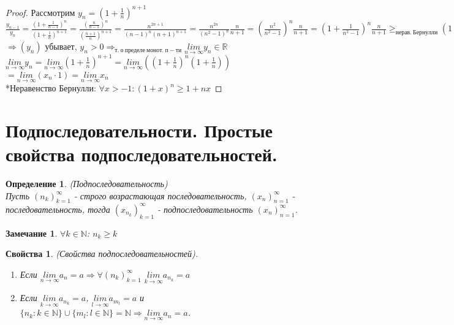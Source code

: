 \documentclass[12pt, a4]{article}
\newtheorem*{definition}{Определение}
\newtheorem*{remark}{Замечание}
\newtheorem*{properties}{Свойства}
\renewcommand{\lim}[2]{\underset{#1 \rightarrow #2}{lim}}
\newcommand{\limn}{\lim{n}{\infty}}
\renewcommand{\implies}{\Rightarrow}
\newcommand{\R}{\mathbb{R}}
\newcommand{\N}{\mathbb{N}}
\begin{document}
\begin{proof}

Рассмотрим $y_n = (1 + \frac{1}{n})^{n+1}$\\
$\frac{y_{n-1}}{y_n} = \frac{(1 + \frac{1}{n-1})^n}{(1 + \frac{1}{n})^{n+1}}=\frac{(\frac{n}{n-1})^n}{(\frac{n+1}{n})^{n+1}}=\frac{n^{2n+1}}{(n-1)^n (n+1)^{n+1}} = \frac{n^{2n}}{(n^2-1)^n} \frac{n}{n+1} = (\frac{n^2}{n^2-1})^n \frac{n}{n+1} = (1 + \frac{1}{n^2-1})^n \frac{n}{n+1} \geq_{нерав.\ Бернулли} (1+\frac{n}{n^2-1}) \frac{n}{n+1} = \frac{n^2+n-1}{n^2-1} \frac{n}{n+1} = \frac{n^3+n^2-n}{n^3+n^2-n-1} \geq 1$\\$ \implies (y_n)$ убывает, $y_n > 0 \implies_{т.\ о\ пределе\ монот.\ п-ти} \limn y_n \in \R$\\

$\limn y_n = \limn (1 + \frac{1}{n})^{n+1} = \limn ((1 + \frac{1}{n})^n (1 + \frac{1}{n}))$\\$ = \limn (x_n \cdot 1) = \limn x_n$\\

*Неравенство Бернулли: $\forall x > -1: (1+x)^n \geq 1 + nx$

\end{proof}

\section{Подпоследовательности. Простые свойства подпоследовательностей.}

\begin{definition}(Подпоследовательность)\\
Пусть $(n_k)_{k=1}^\infty$ - строго возрастающая последовательность, $(x_n)_{n=1}^\infty$ - последовательность, тогда $(x_{n_k})_{k=1}^\infty$ - подпоследовательность $(x_n)_{n=1}^\infty$.
\end{definition}

\begin{remark}
$\forall k \in \N$: $ n_k \geq k$
\end{remark}

\begin{properties}(Свойства подпоследовательностей).
\begin{enumerate}

    \item Если $\limn a_n = a \Rightarrow \forall (n_k)_{k=1}^\infty$ $\lim{k}{\infty}a_{n_k} = a$
    
    \item Если $\lim{k}{\infty}a_{n_k} = a$, $\lim{l}{\infty}a_{m_l} = a$ и $\{n_k:k\in\N\}\cup \{m_l:l\in\N\} = \N \Rightarrow \limn a_n = a$.
    
\end{enumerate}
\end{properties}
\end{document}
